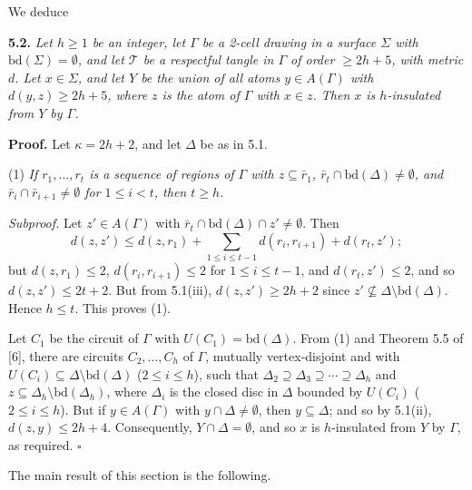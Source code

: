 We deduce

\textbf{5.2.} \textit{Let $h \ge 1$ be an integer, let $\Gamma$ be a 2-cell drawing in a surface $\Sigma$ with $\text{bd}(\Sigma) = \emptyset$, and let $\mathcal{T}$ be a respectful tangle in $\Gamma$ of order $\ge 2h + 5$, with metric $d$. Let $x \in \Sigma$, and let $Y$ be the union of all atoms $y \in A(\Gamma)$ with $d(y, z) \ge 2h + 5$, where $z$ is the atom of $\Gamma$ with $x \in z$. Then $x$ is $h$-insulated from $Y$ by $\Gamma$.}

\textbf{Proof.} Let $\kappa = 2h + 2$, and let $\Delta$ be as in 5.1.

\hspace*{12pt}(1) \textit{If $r_1, \ldots, r_t$ is a sequence of regions of $\Gamma$ with $z \subseteq \bar{r}_1$, $\bar{r}_t \cap \text{bd}(\Delta) \ne \emptyset$, and $\bar{r}_i \cap \bar{r}_{i+1} \ne \emptyset$ for $1 \le i < t$, then $t \ge h$.}

\textit{Subproof.} Let $z' \in A(\Gamma)$ with $\bar{r}_t \cap \text{bd}(\Delta) \cap z' \ne \emptyset$. Then
\begin{equation*}
d(z, z') \le d(z, r_1) + \sum_{1 \le i \le t-1} d(r_i, r_{i+1}) + d(r_t, z');
\end{equation*}
but $d(z, r_1) \le 2$, $d(r_i, r_{i+1}) \le 2$ for $1 \le i \le t - 1$, and $d(r_t, z') \le 2$, and so $d(z, z') \le 2t + 2$. But from 5.1(iii), $d(z, z') \ge 2h + 2$ since $z' \nsubseteq \Delta \setminus \text{bd}(\Delta)$. Hence $h \le t$. This proves (1).

Let $C_1$ be the circuit of $\Gamma$ with $U(C_1) = \text{bd}(\Delta)$. From (1) and Theorem 5.5 of [6], there are circuits $C_2, \ldots, C_h$ of $\Gamma$, mutually vertex-disjoint and with $U(C_i) \subseteq \Delta \setminus \text{bd}(\Delta)$ ($2 \le i \le h$), such that $\Delta_2 \supseteq \Delta_3 \supseteq \cdots \supseteq \Delta_h$ and $z \subseteq \Delta_h \setminus \text{bd}(\Delta_h)$, where $\Delta_i$ is the closed disc in $\Delta$ bounded by $U(C_i)$ ($2 \le i \le h$). But if $y \in A(\Gamma)$ with $y \cap \Delta \ne \emptyset$, then $y \subseteq \Delta$; and so by 5.1(ii), $d(z, y) \le 2h + 4$. Consequently, $Y \cap \Delta = \emptyset$, and so $x$ is $h$-insulated from $Y$ by $\Gamma$, as required. $\square$

The main result of this section is the following.

